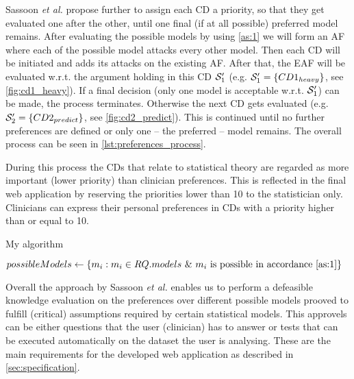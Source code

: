 Sassoon \textit{et al.} propose further to assign each \gls{CD} a priority, so that they get evaluated one after the other, until one final (if at all possible) preferred model remains. After evaluating the possible models by using \autoref{as:1} we will form an \gls{AF} where each of the possible model attacks every other model. Then each \gls{CD} will be initiated and adds its attacks on the existing \gls{AF}. After that, the \gls{EAF} will be evaluated w.r.t. the argument holding in this \gls{CD} $\S_1'$ (e.g. $\S_1' = \{CD1_{heavy}\}$, see \autoref{fig:cd1_heavy}). If a final decision (only one model is acceptable w.r.t. $\S_1'$) can be made, the process terminates. Otherwise the next \gls{CD} gets evaluated (e.g. $\S_2' = \{CD2_{predict}\}$, see \autoref{fig:cd2_predict}). This is continued until no further preferences are defined or only one -- the preferred -- model remains. The overall process can be seen in \autoref{lst:preferences_process}.

During this process the \glspl{CD} that relate to statistical theory are regarded as more important (lower priority) than clinician preferences. This is reflected in the final web application by reserving the priorities lower than 10 to the statistician only. Clinicians can express their personal preferences in \glspl{CD} with a priority higher than or equal to 10. 
 
\begin{algorithm}[h]
\caption{My algorithm}\label{lst:preferences_process}
\begin{algorithmic}[1]
\State $possibleModels \gets \{m_i : m_i \in RQ.models~\&~ m_i\text{ is possible in accordance \autoref{as:1}} \}$
\EndProcedure
\end{algorithmic}
\end{algorithm}

Overall the approach by Sassoon \textit{et al.} enables us to perform a defeasible knowledge evaluation on the preferences over different possible models prooved to fulfill (critical) assumptions required by certain statistical models. This approvels can be either questions that the user (clinician) has to answer or tests that can be executed automatically on the dataset the user is analysing. 
These are the main requirements for the developed web application as described in \autoref{sec:specification}.
